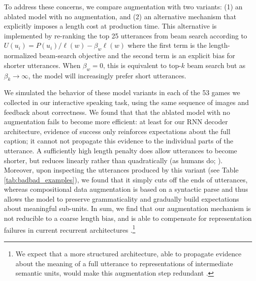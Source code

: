 \documentclass[11pt,a4paper]{article}
\begin{document}
To address these concerns, we compare augmentation with two variants: (1) an ablated model with no augmentation, and (2) an alternative mechanism that explicitly imposes a length cost at production time. 
This alternative is implemented by re-ranking the top 25 utterances from beam search according to $U(u_i) = P(u_i)/\ell(w) - \beta_w \ell(w)$ where the first term is the length-normalized beam-search objective and the second term is an explicit bias for shorter utterances.
When $\beta_w=0$, this is equivalent to top-$k$ beam search but as $\beta_k \rightarrow \infty$, the model will increasingly prefer short utterances.

We simulated the behavior of these model variants in each of the 53 games we collected in our interactive speaking task, using the same sequence of images and feedback about correctness. 
We found that that the ablated model with no augmentation fails to become more efficient: at least for our RNN decoder architecture, evidence of success only reinforces expectations about the full caption; it cannot not propagate this evidence to the individual parts of the utterance.
A sufficiently high length penalty does allow utterances to become shorter, but reduces linearly rather than quadratically (as humans do; \citealp{ClarkWilkesGibbs86_ReferringCollaborative,hawkins2019characterizing}).
Moreover, upon inspecting the utterances produced by this variant (see Table \ref{tab:badbad_examples}), we found that it simply cuts off the ends of utterances, whereas compositional data augmentation is based on a syntactic parse and thus allows the model to preserve grammaticality and gradually build expectations about meaningful sub-units.
In sum, we find that our augmentation mechanism is not reducible to a coarse length bias, and is able to compensate for representation failures in current recurrent architectures \cite{dasgupta2018evaluating, nikolaus2019compositional}.\footnote{We expect that a more structured architecture, able to propagate evidence about the meaning of a full utterance to representations of intermediate semantic units, would make this augmentation step redundant \cite[e.g.][]{tai2015improved,gan2017semantic,mccoy_does_2020}.}




\end{document}
